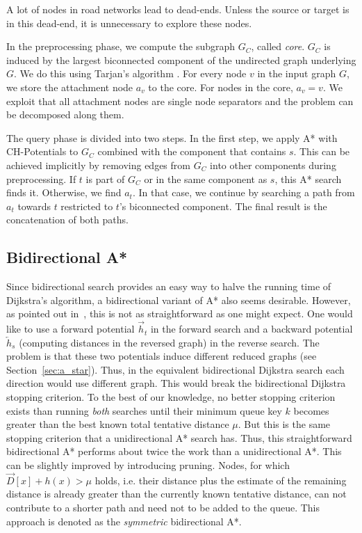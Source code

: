 \documentclass[manuscript,review]{acmart}
\begin{document}
A lot of nodes in road networks lead to dead-ends.
Unless the source or target is in this dead-end, it is unnecessary to explore these nodes.

In the preprocessing phase, we compute the subgraph $G_C$, called \emph{core}.
$G_C$ is induced by the largest biconnected component of the undirected graph underlying $G$.
We do this using Tarjan's algorithm \cite{t-dfslg2-72}.
For every node $v$ in the input graph $G$, we store the attachment node $a_v$ to the core.
For nodes in the core, $a_v=v$.
We exploit that all attachment nodes are single node separators and the problem can be decomposed along them.

The query phase is divided into two steps.
In the first step, we apply A* with CH-Potentials to $G_C$ combined with the component that contains $s$.
This can be achieved implicitly by removing edges from $G_C$ into other components during preprocessing.
If $t$ is part of $G_C$ or in the same component as $s$, this A* search finds it.
Otherwise, we find $a_t$.
In that case, we continue by searching a path from $a_t$ towards $t$ restricted to $t$'s biconnected component.
The final result is the concatenation of both paths.

\subsection{Bidirectional A*}

Since bidirectional search provides an easy way to halve the running time of Dijkstra's algorithm, a bidirectional variant of A* also seems desirable.
However, as pointed out in~\cite{gh-cspas-05}, this is not as straightforward as one might expect.
One would like to use a forward potential $\overrightarrow{h}_t$ in the forward search and a backward potential $\overleftarrow{h}_s$ (computing distances in the reversed graph) in the reverse search.
The problem is that these two potentials induce different reduced graphs (see Section~\ref{sec:a_star}).
Thus, in the equivalent bidirectional Dijkstra search each direction would use different graph.
This would break the bidirectional Dijkstra stopping criterion.
To the best of our knowledge, no better stopping criterion exists than running \emph{both} searches until their minimum queue key $k$ becomes greater than the best known total tentative distance $\mu$.
But this is the same stopping criterion that a unidirectional A* search has.
Thus, this straightforward bidirectional A* performs about twice the work than a unidirectional A*.
This can be slightly improved by introducing pruning.
Nodes, for which $\overrightarrow{D}[x] + h(x) > \mu$ holds, i.e. their distance plus the estimate of the remaining distance is already greater than the currently known tentative distance, can not contribute to a shorter path and need not to be added to the queue.
This approach is denoted as the \emph{symmetric} bidirectional A*.
\end{document}
